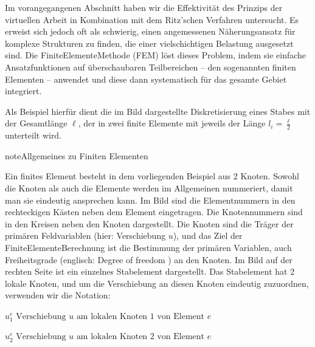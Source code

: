 \documentclass[letterpaper,10pt,german]{jupyterBook}
\begin{document}
\sphinxAtStartPar
Im vorangegangenen Abschnitt haben wir die Effektivität des Prinzips der virtuellen Arbeit in Kombination mit dem Ritz’schen Verfahren untersucht. Es erweist sich jedoch oft als schwierig, einen angemessenen Näherungsansatz für komplexe Strukturen zu finden, die einer vielschichtigen Belastung ausgesetzt sind. Die Finite\sphinxhyphen{}Elemente\sphinxhyphen{}Methode (FEM) löst dieses Problem, indem sie einfache Ansatzfunktionen auf überschaubaren Teilbereichen – den sogenannten finiten Elementen – anwendet und diese dann systematisch für das gesamte Gebiet integriert.

\sphinxAtStartPar
Als Beispiel hierfür dient die im Bild  dargestellte Diskretisierung eines Stabes mit der Gesamtlänge \(\ell\), der in zwei finite Elemente mit jeweils der Länge \(l_i = \frac{\ell}{2}\) unterteilt wird.

\begin{sphinxadmonition}{note}{Allgemeines zu Finiten Elementen}

\sphinxAtStartPar
Ein finites Element besteht in dem vorliegenden Beispiel aus 2 Knoten. Sowohl die Knoten als auch die Elemente werden im Allgemeinen nummeriert, damit man sie eindeutig ansprechen kann. Im Bild sind die Elementnummern in den rechteckigen Kästen neben dem Element eingetragen. Die Knotennummern sind in den Kreisen neben den Knoten dargestellt. Die Knoten sind die Träger der primären Feldvariablen (hier: Verschiebung \(u\)), und das Ziel der Finite\sphinxhyphen{}Elemente\sphinxhyphen{}Berechnung ist die Bestimmung der primären Variablen, auch Freiheitsgrade (englisch: Degree of freedom ) an den Knoten. Im Bild  auf der rechten Seite ist ein einzelnes Stabelement dargestellt. Das Stabelement hat 2 lokale Knoten, und um die Verschiebung an diesen Knoten eindeutig zuzuordnen, verwenden wir die Notation:

\sphinxAtStartPar
\(
u_1^{e} \text{ Verschiebung } u \text{ am lokalen Knoten 1 von Element } e
\)

\sphinxAtStartPar
\(
u_2^{e} \text{ Verschiebung } u \text{ am lokalen Knoten 2 von Element } e
\)
\end{sphinxadmonition}
\end{document}
